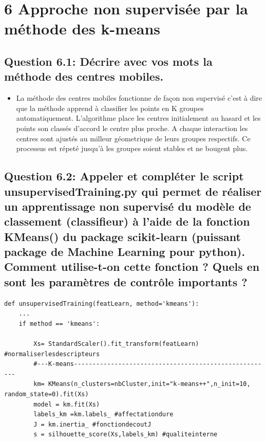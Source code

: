 \section*{6 Approche non supervisée par la méthode des k-means}

\subsection*{Question 6.1: Décrire avec vos mots la méthode des centres mobiles.}

\begin{itemize}
    \item La méthode des centres mobiles fonctionne de façon non supervisé c'est à dire que la méthode apprend à classifier les
    points en K groupes automatiquement. L'algorithme place les centres initialement au hasard et les points son classés d'accord
    le centre plus proche. A chaque interaction les centres sont ajustés au milleur géometrique de leurs groupes respectifs. Ce processus
    est répeté jusqu'à les groupes soient stables et ne bougent plus.
\end{itemize}

\subsection*{Question 6.2: Appeler et compléter le script
unsupervisedTraining.py qui permet de réaliser un
apprentissage non supervisé du modèle de classement (classifieur) à l’aide de la fonction
KMeans()
du package scikit-learn (puissant package de Machine Learning pour python). Comment utilise-t-on
cette fonction ? Quels en sont les paramètres de contrôle importants ?}


\begin{lstlisting}
def unsupervisedTraining(featLearn, method='kmeans'):
    ...
    if method == 'kmeans':

        Xs= StandardScaler().fit_transform(featLearn) #normaliserlesdescripteurs
        #---K-means------------------------------------------------------
        km= KMeans(n_clusters=nbCluster,init="k-means++",n_init=10, random_state=0).fit(Xs)
        model = km.fit(Xs)
        labels_km =km.labels_ #affectationdure
        J = km.inertia_ #fonctiondecoutJ
        s = silhouette_score(Xs,labels_km) #qualiteinterne
    
\end{lstlisting}


